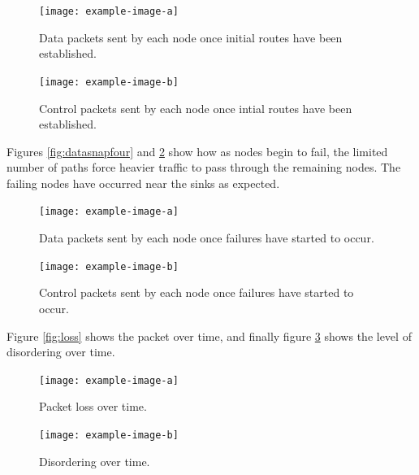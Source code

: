 \documentclass[12pt]{article}
\begin{document}
\begin{figure}[!ht]
    \centering
    \begin{minipage}{0.45\textwidth}
        \centering
        \texttt{[image: example-image-a]} %
        \caption{Data packets sent by each node once initial routes have been established.}
        \label{fig:datasnaptwo}
    \end{minipage}\hfill
    \begin{minipage}{0.45\textwidth}
        \centering
       \texttt{[image: example-image-b]} %
        \caption{Control packets sent by each node once intial routes have been established.}
        \label{fig:ctrlsnaptwo}
    \end{minipage}
\end{figure}

Figures \ref{fig:datasnapfour} and \ref{fig:ctrlsnapfour} show how as nodes begin to fail, the limited number of paths force heavier traffic to pass through the remaining nodes. The failing nodes have occurred near the sinks as expected.

\begin{figure}[!ht]
    \centering
    \begin{minipage}{0.45\textwidth}
        \centering
        \texttt{[image: example-image-a]} %
        \caption{Data packets sent by each node once failures have started to occur.}
        \label{fig:datasnapfour}
    \end{minipage}\hfill
    \begin{minipage}{0.45\textwidth}
        \centering
        \texttt{[image: example-image-b]} %
        \caption{Control packets sent by each node once failures have started to occur.}
        \label{fig:ctrlsnapfour}
    \end{minipage}
\end{figure}

Figure \ref{fig:loss} shows the packet over time, and finally figure \ref{fig:dis} shows the level of disordering over time.

\begin{figure}[!ht]
    \centering
    \begin{minipage}{0.45\textwidth}
        \centering
        \texttt{[image: example-image-a]} %
        \caption{Packet loss over time.}
        \label{fig:loss}
    \end{minipage}\hfill
    \begin{minipage}{0.45\textwidth}
        \centering
        \texttt{[image: example-image-b]} %
        \caption{Disordering over time.}
        \label{fig:dis}
    \end{minipage}\hfill
\end{figure}
\end{document}
